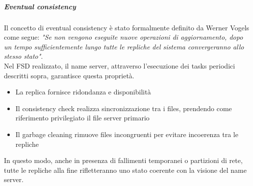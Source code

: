 \documentclass[a4paper, 12pt]{scrreprt}
\begin{document}
            \subparagraph{Eventual consistency}

                Il concetto di eventual consistency è stato formalmente definito da Werner Vogels come segue: \textit{"Se non vengono eseguite nuove operazioni di aggiornamento, dopo un tempo sufficientemente lungo tutte le repliche del sistema convergeranno allo stesso stato"}.\\
                Nel FSD realizzato, il name server, attraverso l'esecuzione dei tasks periodici descritti sopra, garantisce questa proprietà.

                \begin{itemize}

                    \item La replica fornisce ridondanza e disponibilità

                    \item Il consistency check realizza sincronizzazione tra i files, prendendo come riferimento privilegiato il file server primario

                    \item Il garbage cleaning rimuove files incongruenti per evitare incoerenza tra le repliche

                \end{itemize}

                In questo modo, anche in presenza di fallimenti temporanei o partizioni di rete, tutte le repliche alla fine rifletteranno uno stato coerente con la visione del name server.
\end{document}
